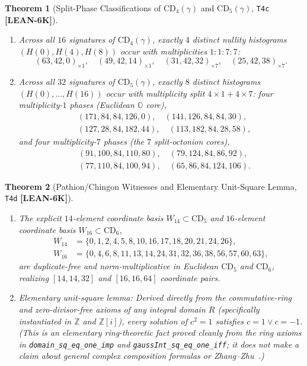 \documentclass[11pt,reqno]{amsart}
\newcommand{\code}[1]{\textnormal{\texttt{\small\nolinkurl{#1}}}}
\theoremstyle{plain}
\newtheorem{theorem}{Theorem}[section]
\theoremstyle{definition}
\theoremstyle{remark}
\newcommand{\tagLean}{\mbox{\textsf{\textbf{\color{oiBlue}[LEAN-6K]}}}}
\newcommand{\CD}{\mathrm{CD}}
\newcommand{\OO}{\mathbb{O}}
\newcommand{\Z}{\mathbb{Z}}
\begin{document}
\begin{theorem}[Split-Phase Classifications of $\CD_4(\gamma)$ and $\CD_5(\gamma)$, \texttt{T4c} \tagLean]
\label{thm:t4c}
\hfill\par\noindent
\begin{enumerate}[leftmargin=2em,topsep=2pt]
  \item Across all $16$ signatures of $\CD_4(\gamma)$, exactly $4$ distinct nullity histograms
    $(H(0), H(4), H(8))$ occur with multiplicities $1{:}1{:}7{:}7$:
    \[
      (63,42,0)_{\times 1},\quad (49,42,14)_{\times 1},\quad
      (31,42,32)_{\times 7},\quad (25,42,38)_{\times 7}.
    \]
  \item Across all $32$ signatures of $\CD_5(\gamma)$, exactly $8$ distinct histograms
    $(H(0),\dots,H(16))$ occur with multiplicity split $4{\times}1 + 4{\times}7$:
    four multiplicity-$1$ phases (Euclidean $\OO$ core),
    \begin{align*}
      &(171,84,84,126,0),\quad (141,126,84,84,30),\\
      &(127,28,84,182,44),\quad (113,182,84,28,58),
    \end{align*}
    and four multiplicity-$7$ phases (the $7$ split-octonion cores),
    \begin{align*}
      &(91,100,84,110,80),\quad (79,124,84,86,92),\\
      &(77,110,84,100,94),\quad (65,86,84,124,106).
    \end{align*}
\end{enumerate}
\end{theorem}

\begin{theorem}[Pathion/Chingon Witnesses and Elementary Unit-Square Lemma, \texttt{T4d} \tagLean]
\label{thm:t4d}
\hfill\par\noindent
\begin{enumerate}[leftmargin=2em,topsep=2pt]
  \item The explicit $14$-element coordinate basis $W_{14} \subset \CD_5$ and $16$-element
    coordinate basis $W_{16} \subset \CD_6$,
    \begin{align*}
      W_{14} &= \{0,1,2,4,5,8,10,16,17,18,20,21,24,26\},\\
      W_{16} &= \{0,4,6,8,11,13,14,24,31,32,36,38,56,57,60,63\},
    \end{align*}
    are duplicate-free and norm-multiplicative in Euclidean $\CD_5$ and $\CD_6$, realizing
    $[14, 14, 32]$ and $[16, 16, 64]$ coordinate pairs.
  \item \emph{Elementary unit-square lemma:} Derived directly from the commutative-ring and
    zero-divisor-free axioms of any integral domain $R$ (specifically instantiated in $\Z$ and
    $\Z[i]$), every solution of $c^2 = 1$ satisfies $c = 1 \lor c = -1$. (This is an elementary
    ring-theoretic fact proved cleanly from the ring axioms in \code{domain_sq_eq_one_imp} and
    \code{gaussInt_sq_eq_one_iff}; it does \emph{not} make a claim about general complex
    composition formulas or Zhang--Zhu~\cite{zhangzhu2026hurwitz}.)
\end{enumerate}
\end{theorem}
\end{document}
